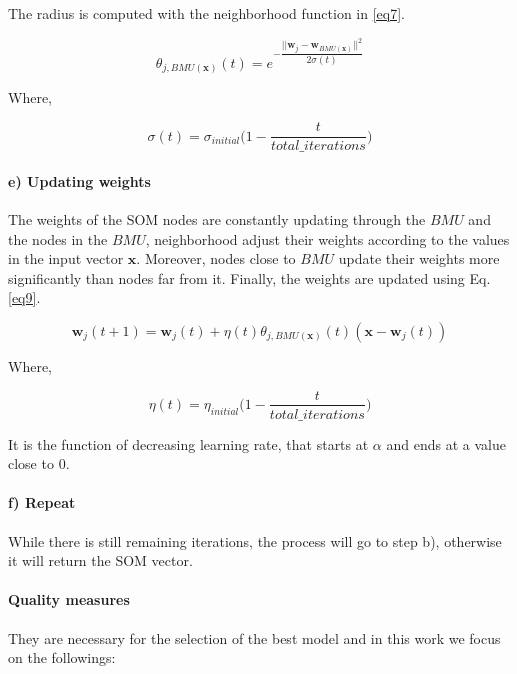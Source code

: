 \documentclass[conference]{IEEEtran}
\begin{document}
The radius is computed with the neighborhood function in \eqref{eq7}.

\begin{equation}
\label{eq7}
\theta_{j,BMU(\boldsymbol{x})}(t) = e ^ { -\dfrac
{||\boldsymbol{w}_j - \boldsymbol{w}_{BMU(\boldsymbol{x})}||^{2}}
{2 \sigma (t)}
}
\end{equation}

Where,

\begin{equation}
\label{eq8}
\sigma (t) = \sigma_{initial} \bigg(1 - \dfrac {t} {total\_iterations} \bigg)
\end{equation}

\paragraph*{e) Updating weights} 

The weights of the SOM nodes are constantly updating through the $BMU$ and the nodes in the $BMU$, neighborhood adjust their weights according to the values in the input vector $\boldsymbol{x}$. Moreover, nodes close to $BMU$ update their weights more significantly than nodes far from it. Finally, the weights are updated using Eq.\eqref{eq9}.

\begin{equation}
\label{eq9}
\boldsymbol{w}_j(t+1) = \boldsymbol{w}_j(t) + \eta(t) \theta_{j,BMU(\boldsymbol{x})}(t)(\boldsymbol{x}-\boldsymbol{w}_j(t))
\end{equation}

Where,

\begin{equation}
\label{eq10}
\eta (t) = \eta_{initial} \bigg(1 - \dfrac {t} {total\_iterations} \bigg)
\end{equation}

It is the function of decreasing learning rate, that starts at $\alpha$ and ends at a value close to $0$.

\paragraph*{f) Repeat} 

While there is still remaining iterations, the process will go to step b), otherwise it will return the SOM vector.

\paragraph{Quality measures} 
They are necessary for the selection of the best model and in this work we focus on the followings:
\end{document}
